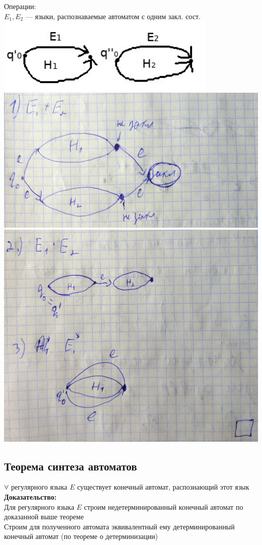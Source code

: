 \documentclass[12pt]{article}
\begin{document}
	Операции:\\
	$E_1, E_2$ — языки, распознаваемые автоматом с одним закл. сост.\\
	\includegraphics[width=300pt]{58}\\
	\includegraphics[width=400pt]{59}\\
	\includegraphics[width=400pt]{60}\\
\subsection{Теорема синтеза автоматов}
	$\forall$ регулярного языка $E$ существует конечный автомат, распознающий этот язык\\
	\textbf{Доказательство:}\\
		Для регулярного языка $E$ строим недетерминированный конечный автомат по доказанной выше теореме\\
		Строим для полученного автомата эквивалентный ему детерминированный конечный автомат (по теореме о детерминизации)\\
	\qedsymbol
\end{document}
